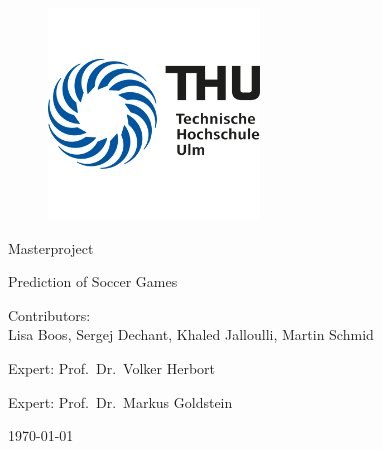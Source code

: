 \begin{titlepage}
    \newcommand{\HRule}{\rule{\linewidth}{1.5mm}}
    \center{}
    \begin{figure}
        \centering
        \includegraphics[width=0.5\textwidth]{../Bilder/th-ulm}\label{pic:Logo}
    \end{figure}

    \begin{center}
    \end{center}

    {\huge Masterproject}\\[0.4cm]
    \begin{center}
    \end{center}
    {\Large Prediction of Soccer Games }\\
    \vfill
    \begin{center}
        {Contributors:}\ \\
        \vspace{0.25\baselineskip}
        {\Large Lisa Boos, Sergej Dechant, Khaled Jalloulli, Martin Schmid}
    \end{center}
    \vfill
    \begin{center}
        {\large Expert: Prof.\ Dr.\ Volker Herbort}
    \end{center}
    \begin{center}
        {\large Expert: Prof.\ Dr.\ Markus Goldstein}
    \end{center}
    \vfill
    {\Large \today}

\end{titlepage}